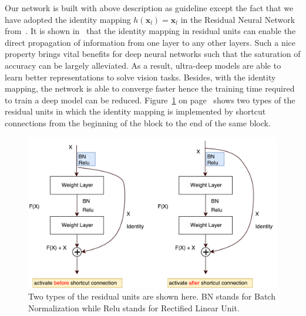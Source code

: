 Our network is built with above description as guideline except the 
fact that we have adopted the identity mapping 
\(h(\mathbf{x}_l)=\mathbf{x}_l\) in the Residual 
Neural Network from~\parencite{RN67}.
It is shown in~\parencite{RN68} that
the identity mapping in residual units
can enable the direct propagation of information
from one layer to any other layers.
Such a nice property brings vital benefits
for deep neural networks such that the saturation of accuracy
can be largely alleviated.
As a result, ultra-deep models are able to
learn better representations to solve
vision tasks.
Besides, with the identity mapping, the network
is able to converge faster hence the training time
required to train a deep model can be reduced.
Figure~\ref{fig:basic-resnet-structure} on 
page~\pageref{fig:basic-resnet-structure}
shows two types
of the residual units in which the identity mapping
is implemented by shortcut connections from 
the beginning of the block
to the end of the same block.
\begin{figure}
    \centering
    \includegraphics[width=\textwidth,height=\textheight,keepaspectratio]{Figures/basic-resnet-structure.pdf}
    \caption[Two types of the residual units]{
        Two types of the residual units are shown here.
        BN stands for Batch Normalization while
        Relu stands for Rectified Linear Unit.
        }\label{fig:basic-resnet-structure}
\end{figure}

